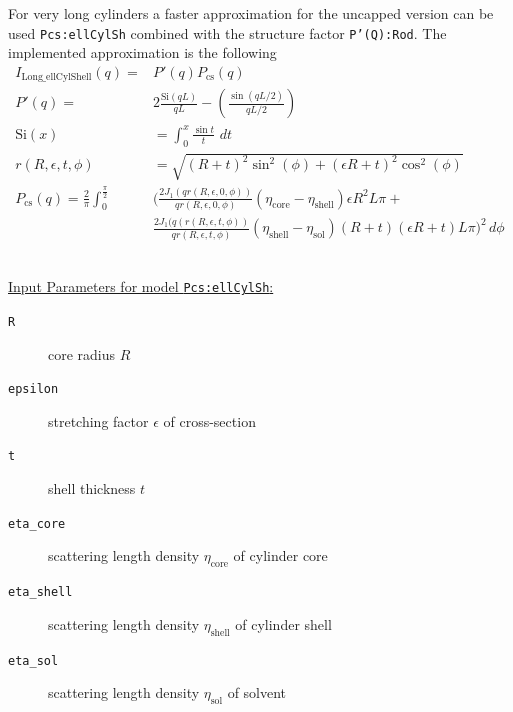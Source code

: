 \noindent For very long cylinders a faster approximation for the
uncapped version can be used \texttt{Pcs:ellCylSh}
combined with the structure factor \texttt{P'(Q):Rod}.
The implemented approximation is the following
\begin{align}
  I_\text{Long\_ellCylShell}(q) = & P'(q) P_\text{cs}(q) \\
  P'(q)  = & 2 \frac{\text{Si}(q L)}{qL} - \left(\frac{\sin(qL/2)}{qL/2}\right) \\
  \text{Si}(x) & = \int_0^x\!\frac{\sin t}{t}\,\,dt \\
  r(R,\epsilon,t,\phi) &= \sqrt{(R+t)^2\sin^2(\phi)+(\epsilon R+t)^2\cos^2(\phi)}\\
  P_\text{cs}(q)  =  \frac{2}{\pi} \int_0^{\frac{\pi}{2}}& \biggl(
            \frac{2J_1(qr(R,\epsilon,0,\phi))}{qr(R,\epsilon,0,\phi)}
            \left(\eta_\text{core}-\eta_\text{shell}\right)\epsilon R^2L\pi + \label{eq:PcsEllCylSh}\\
         &
            \frac{2J_1(q(r(R,\epsilon,t,\phi))}{qr(R,\epsilon,t,\phi)}
            \left(\eta_\text{shell}-\eta_\text{sol}\right)(R+t)(\epsilon R+t)L\pi
      \biggr)^2  \, d\phi \nonumber
\end{align}

\hspace{1pt}\\
\uline{Input Parameters for model \texttt{Pcs:ellCylSh}:}\\
\begin{description}
\item[\texttt{R}] core radius $R$
\item[\texttt{epsilon}] stretching factor $\epsilon$ of cross-section
\item[\texttt{t}] shell thickness $t$
\item[\texttt{eta\_core}] scattering length density $\eta_\text{core}$ of cylinder core
\item[\texttt{eta\_shell}] scattering length density $\eta_\text{shell}$ of cylinder shell
\item[\texttt{eta\_sol}] scattering length density $\eta_\text{sol}$ of solvent
\end{description}

